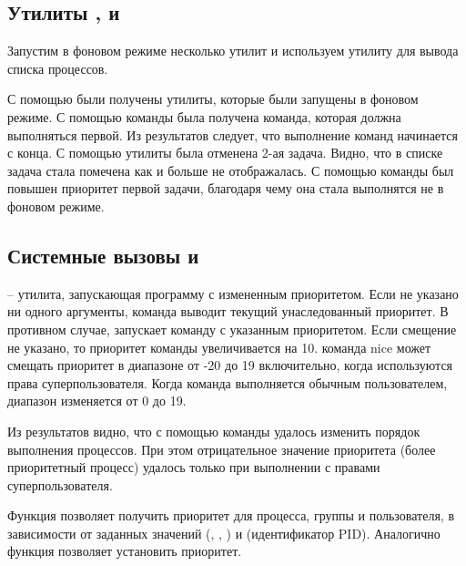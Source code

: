 \subsection{Утилиты ,  и }

Запустим в фоновом режиме несколько утилит и используем утилиту  для вывода списка процессов.



С помощью  были получены утилиты, которые были запущены в фоновом режиме. С помощью команды  была получена команда, которая должна выполняться первой. Из результатов следует, что выполнение команд начинается с конца. С помощью утилиты  была отменена 2-ая задача. Видно, что в списке  задача стала помечена как  и больше не отображалась. С помощью команды  был повышен приоритет первой задачи, благодаря чему она стала выполнятся не в фоновом режиме.

\subsection{Системные вызовы  и }

 -- утилита, запускающая программу с измененным приоритетом. Если не указано ни одного аргументы, команда выводит текущий унаследованный приоритет. В противном случае,  запускает команду с указанным приоритетом. Если смещение не указано, то приоритет команды увеличивается на 10. команда nice может смещать приоритет в диапазоне от -20 до 19 включительно, когда используются права суперпользователя. Когда команда выполняется обычным пользователем, диапазон изменяется от 0 до 19.



Из результатов видно, что с помощью команды  удалось изменить порядок выполнения процессов. При этом отрицательное значение приоритета (более приоритетный процесс) удалось только при выполнении с правами суперпользователя.

Функция  позволяет получить приоритет для процесса, группы и пользователя, в зависимости от заданных значений  (, , ) и  (идентификатор PID). Аналогично функция  позволяет установить приоритет. 

